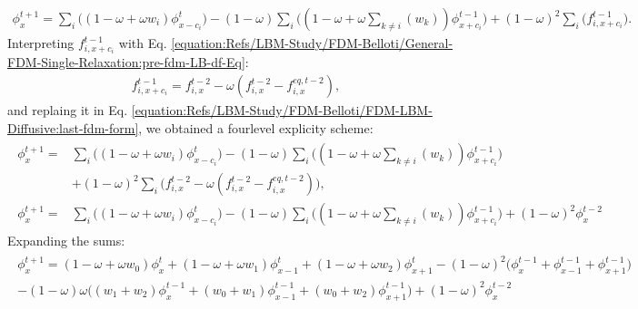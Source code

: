\documentclass[letterpaper,10pt,english,openany,oneside]{jupyterBook}
\begin{document}
\begin{equation}\label{equation:Refs/LBM-Study/FDM-Belloti/FDM-LBM-Diffusive:last-fdm-form}
\begin{split}
\phi_{x}^{t+1} = \displaystyle\sum_{i}\Big( (1-\omega + \omega w_{i}) \phi_{x-c_{i}}^{t}\Big) - (1-\omega)\displaystyle\sum_{i}\Bigg( \left(1-\omega + \omega \displaystyle\sum_{k\neq i} \left(w_{k}\right) \right) \phi_{x+c_{i}}^{t-1} \Bigg) + (1-\omega)^{2}\displaystyle\sum_{i}\Bigg( f_{i,x+c_{i}}^{t-1} \Bigg).
\end{split}
\end{equation}
\sphinxAtStartPar
Interpreting \(f_{i,x+c_{i}}^{t-1}\) with Eq. \eqref{equation:Refs/LBM-Study/FDM-Belloti/General-FDM-Single-Relaxation:pre-fdm-LB-df-Eq}:
\begin{equation*}
\begin{split}
f_{i,x+c_{i}}^{t-1}  = f_{i,x}^{t-2}  - \omega \left( f_{i,x}^{t-2} - f_{i,x}^{eq,t-2} \right) ,
\end{split}
\end{equation*}
\sphinxAtStartPar
and replaing it in Eq. \eqref{equation:Refs/LBM-Study/FDM-Belloti/FDM-LBM-Diffusive:last-fdm-form}, we obtained a four\sphinxhyphen{}level explicity scheme:
\begin{equation}\label{equation:Refs/LBM-Study/FDM-Belloti/FDM-LBM-Diffusive:df-final-form-fdm}
\begin{split}
\begin{array}{ll}
\phi_{x}^{t+1} = & \displaystyle\sum_{i}\Big( (1-\omega + \omega w_{i}) \phi_{x-c_{i}}^{t}\Big) - (1-\omega)\displaystyle\sum_{i}\Bigg( \left(1-\omega + \omega \displaystyle\sum_{k\neq i} \left(w_{k}\right) \right) \phi_{x+c_{i}}^{t-1} \Bigg) \\ 
&+ (1-\omega ) ^{2} \displaystyle\sum_{i}\Bigg(f_{i,x}^{t-2}  - \omega \left( f_{i,x}^{t-2} - f_{i,x}^{eq,t-2} \right)  \Bigg), \\
\phi_{x}^{t+1} = & \displaystyle\sum_{i}\Big( (1-\omega + \omega w_{i}) \phi_{x-c_{i}}^{t}\Big) - (1-\omega)\displaystyle\sum_{i}\Bigg( \left(1-\omega + \omega \displaystyle\sum_{k\neq i} \left(w_{k}\right) \right) \phi_{x+c_{i}}^{t-1} \Bigg) + (1-\omega)^{2} \phi_{x}^{t-2}
\end{array}
\end{split}
\end{equation}
\sphinxAtStartPar
Expanding the sums:
\begin{equation*}
\begin{split}
\begin{array}{c}
\phi_{x}^{t+1} = (1-\omega + \omega w_{0}) \phi_{x}^{t} + (1-\omega + \omega w_{1}) \phi_{x-1}^{t} + (1-\omega + \omega w_{2}) \phi_{x+1}^{t} - (1-\omega)^{2} \Big( \phi_{x}^{t-1} + \phi_{x-1}^{t-1} + \phi_{x+1}^{t-1}  \Big) \\
-(1-\omega)\omega \Big( (w_{1}+w_{2})\phi_{x}^{t-1} + (w_{0}+w_{1})\phi_{x-1}^{t-1} + (w_{0}+w_{2})\phi_{x+1}^{t-1}  \Big) + (1-\omega)^{2} \phi_{x}^{t-2}
\end{array}
\end{split}
\end{equation*}
\end{document}
